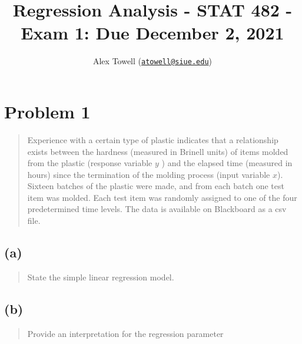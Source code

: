\documentclass[
]{article}
\title{Regression Analysis - STAT 482 - Exam 1: Due December 2, 2021}
\author{Alex Towell
(\href{mailto:atowell@siue.edu}{\nolinkurl{atowell@siue.edu}})}
\date{}
\begin{document}
\maketitle

\newcommand{\sos}[1]{\mathrm{SS_{#1}}}
\newcommand{\ms}[1]{\mathrm{MS_{#1}}}
\newcommand{\sd}{\operatorname{sd}}
\newcommand{\var}{\operatorname{var}}
\newcommand{\expect}{\operatorname{E}}
\newcommand{\corr}{\operatorname{cor}}
\newcommand{\cov}{\operatorname{cov}}
\newcommand{\se}{\operatorname{se}}
\newcommand{\eval}[2]{\left. #1 \right\vert_{#2}}
\newcommand{\degf}[1]{\mathrm{df_{#1}}}
\newcommand{\entropy}{\operatorname{H}}
\newcommand{\param}[1]{\textcolor{blue}{\texttt{#1}}}
\newcommand{\ci}{\operatorname{CI}}

\hypertarget{problem-1}{%
\section{Problem 1}\label{problem-1}}

\begin{quote}
Experience with a certain type of plastic indicates that a relationship
exists between the hardness (measured in Brinell units) of items molded
from the plastic (response variable \(y\) ) and the elapsed time
(measured in hours) since the termination of the molding process (input
variable \(x\)). Sixteen batches of the plastic were made, and from each
batch one test item was molded. Each test item was randomly assigned to
one of the four predetermined time levels. The data is available on
Blackboard as a csv file.
\end{quote}

\vspace{50pt}

\hypertarget{a}{%
\subsection{(a)}\label{a}}

\begin{quote}
State the simple linear regression model.
\end{quote}

\vspace{50pt}

\hypertarget{b}{%
\subsection{(b)}\label{b}}

\begin{quote}
Provide an interpretation for the regression parameter
\end{quote}
\end{document}
